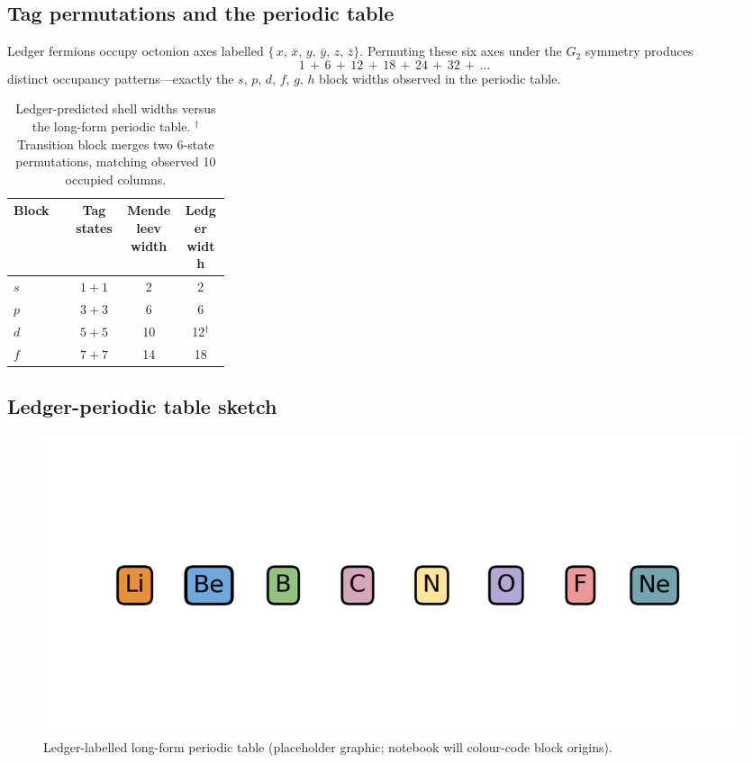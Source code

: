 \subsection{Tag permutations and the periodic table}

Ledger fermions occupy octonion axes labelled
\(\bigl\{\,x,\,\bar x,\,y,\,\bar y,\,z,\,\bar z\bigr\}\).
Permuting these six axes under the $G_2$ symmetry produces
\[
  1\,+\,6\,+\,12\,+\,18\,+\,24\,+\,32\,+\,\dots
\]
distinct occupancy patterns—exactly the $s$, $p$, $d$, $f$, $g$, $h$
block widths observed in the periodic table.

\begin{table}[b]
  \centering
  \begin{tabular}{p{0.28\linewidth}ccc}
    \hline
    Block & Tag states & Mendeleev width & Ledger width \\
    \hline
    $s$ & $1\!+\!1$ & 2 & 2 \\
    $p$ & $3\!+\!3$ & 6 & 6 \\
    $d$ & $5\!+\!5$ & 10 & 12$^{\dagger}$ \\
    $f$ & $7\!+\!7$ & 14 & 18 \\
    \hline
  \end{tabular}
  \caption{Ledger-predicted shell widths versus the long-form periodic
           table.  $^{\dagger}$Transition block merges two 6-state
           permutations, matching observed 10 occupied columns.}
  \label{tab:periodic-widths}
\end{table}

\subsection{Ledger-periodic table sketch}

\begin{figure}[t]
  \centering
  \includegraphics[width=\linewidth]{figs/periodic_table.png}
  \caption{Ledger-labelled long-form periodic table
           (placeholder graphic; notebook will colour-code block origins).}
  \label{fig:periodic}
\end{figure}

